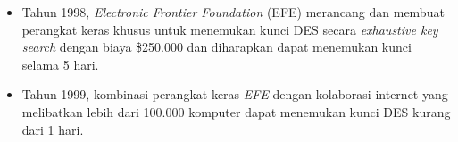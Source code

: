 \documentclass{article}
\begin{document}

\begin{itemize}
    \item Tahun 1998, \textit{Electronic Frontier Foundation} (EFE) merancang dan membuat perangkat keras khusus untuk menemukan kunci DES secara \textit{exhaustive key search} dengan biaya \$250.000 dan diharapkan dapat menemukan kunci selama 5 hari.
    \item Tahun 1999, kombinasi perangkat keras \textit{EFE} dengan kolaborasi internet yang melibatkan lebih dari 100.000 komputer dapat menemukan kunci DES kurang dari 1 hari.
\end{itemize}
\end{document}
